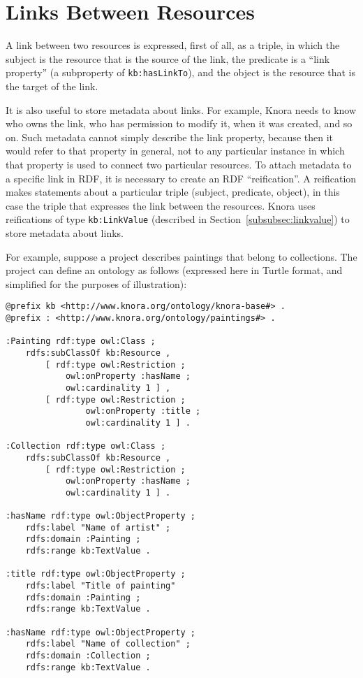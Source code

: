 \documentclass[12pt, a4paper]{article}
\begin{document}
\section{Links Between Resources}

\label{sec:links}

A link between two resources is expressed, first of all, as a triple, in which the subject is the resource that is the source of the link, the predicate is a \enquote{link property} (a subproperty of \texttt{kb:hasLinkTo}), and the object is the resource that is the target of the link.

It is also useful to store metadata about links. For example, Knora needs to know who owns the link, who has permission to modify it, when it was created, and so on. Such metadata cannot simply describe the link property, because then it would refer to that property in general, not to any particular instance in which that property is used to connect two particular resources. To attach metadata to a specific link in RDF, it is necessary to create an RDF \enquote{reification}. A reification makes statements about a particular triple (subject, predicate, object), in this case the triple that expresses the link between the resources. Knora uses reifications of type \texttt{kb:LinkValue} (described in Section~\ref{subsubsec:linkvalue}) to store metadata about links.

For example, suppose a project describes paintings that belong to collections. The project can define an ontology as follows (expressed here in Turtle format, and simplified for the purposes of illustration):

\begin{verbatim}
@prefix kb <http://www.knora.org/ontology/knora-base#> .
@prefix : <http://www.knora.org/ontology/paintings#> .

:Painting rdf:type owl:Class ;
    rdfs:subClassOf kb:Resource ,
        [ rdf:type owl:Restriction ;
            owl:onProperty :hasName ;
            owl:cardinality 1 ] ,
        [ rdf:type owl:Restriction ;
                owl:onProperty :title ;
                owl:cardinality 1 ] .
          
:Collection rdf:type owl:Class ;
    rdfs:subClassOf kb:Resource ,
        [ rdf:type owl:Restriction ;
            owl:onProperty :hasName ;
            owl:cardinality 1 ] .
            
:hasName rdf:type owl:ObjectProperty ;
    rdfs:label "Name of artist" ;
    rdfs:domain :Painting ;
    rdfs:range kb:TextValue .
            
:title rdf:type owl:ObjectProperty ;
    rdfs:label "Title of painting"
    rdfs:domain :Painting ;
    rdfs:range kb:TextValue .

:hasName rdf:type owl:ObjectProperty ;
    rdfs:label "Name of collection" ;
    rdfs:domain :Collection ;
    rdfs:range kb:TextValue .
\end{verbatim}
\end{document}
